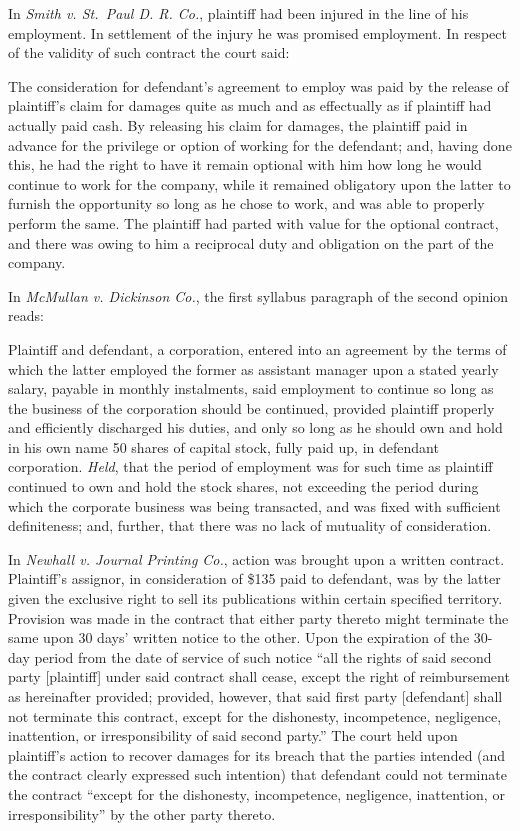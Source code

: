 \documentclass[
  letterpaper,
  11pt,
  DIV=9,
  openright]{scrbook}
\renewenvironment{quote}{
  \list{}{\leftmargin=2em\rightmargin=2em}
  \item\relax\small
}
{\endlist}
\begin{document}
In \emph{Smith v. St.~Paul D. R. Co.}, plaintiff had been injured in the
line of his employment. In settlement of the injury he was promised
employment. In respect of the validity of such contract the court said:

\begin{quote}
The consideration for defendant's agreement to employ was paid by the
release of plaintiff's claim for damages quite as much and as
effectually as if plaintiff had actually paid cash. By releasing his
claim for damages, the plaintiff paid in advance for the privilege or
option of working for the defendant; and, having done this, he had the
right to have it remain optional with him how long he would continue to
work for the company, while it remained obligatory upon the latter to
furnish the opportunity so long as he chose to work, and was able to
properly perform the same. The plaintiff had parted with value for the
optional contract, and there was owing to him a reciprocal duty and
obligation on the part of the company.
\end{quote}

In \emph{McMullan v. Dickinson Co.}, the first syllabus paragraph of the
second opinion reads:

\begin{quote}
Plaintiff and defendant, a corporation, entered into an agreement by the
terms of which the latter employed the former as assistant manager upon
a stated yearly salary, payable in monthly instalments, said employment
to continue so long as the business of the corporation should be
continued, provided plaintiff properly and efficiently discharged his
duties, and only so long as he should own and hold in his own name 50
shares of capital stock, fully paid up, in defendant corporation.
\emph{Held}, that the period of employment was for such time as
plaintiff continued to own and hold the stock shares, not exceeding the
period during which the corporate business was being transacted, and was
fixed with sufficient definiteness; and, further, that there was no lack
of mutuality of consideration.
\end{quote}

In \emph{Newhall v. Journal Printing Co.}, action was brought upon a
written contract. Plaintiff's assignor, in consideration of \$135 paid
to defendant, was by the latter given the exclusive right to sell its
publications within certain specified territory. Provision was made in
the contract that either party thereto might terminate the same upon 30
days' written notice to the other. Upon the expiration of the 30-day
period from the date of service of such notice ``all the rights of said
second party {[}plaintiff{]} under said contract shall cease, except the
right of reimbursement as hereinafter provided; provided, however, that
said first party {[}defendant{]} shall not terminate this contract,
except for the dishonesty, incompetence, negligence, inattention, or
irresponsibility of said second party.'' The court held upon plaintiff's
action to recover damages for its breach that the parties intended (and
the contract clearly expressed such intention) that defendant could not
terminate the contract ``except for the dishonesty, incompetence,
negligence, inattention, or irresponsibility'' by the other party
thereto.
\end{document}
